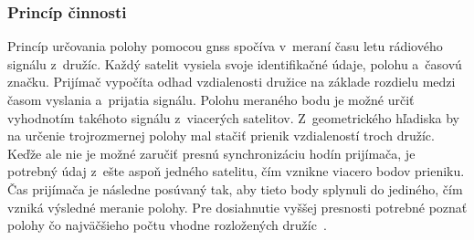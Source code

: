     \subsubsection{Princíp činnosti}

      Princíp určovania polohy pomocou \acrshort{gnss} spočíva v~meraní času letu rádiového signálu z~družíc. Každý satelit vysiela svoje identifikačné údaje, polohu a~časovú značku. Prijímač vypočíta odhad vzdialenosti družice na základe rozdielu medzi časom vyslania a~prijatia signálu. Polohu meraného bodu je možné určiť vyhodnotím takéhoto signálu z~viacerých satelitov. Z~geometrického hľadiska by na určenie trojrozmernej polohy mal stačiť prienik vzdialeností troch družíc. Keďže ale nie je možné zaručiť presnú synchronizáciu hodín prijímača, je potrebný údaj z~ešte aspoň jedného satelitu, čím vznikne viacero bodov prieniku. Čas prijímača je následne posúvaný tak, aby tieto body splynuli do jediného, čím vzniká výsledné meranie polohy. Pre dosiahnutie vyššej presnosti potrebné poznať polohy čo najväčšieho počtu vhodne rozložených družíc~\cite{duchonSnimaceMobilnejRobotike2012}.

